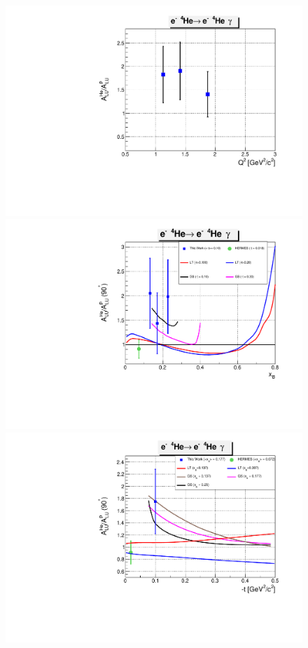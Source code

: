 \begin{figure}[tp]
\centering
\includegraphics[scale=0.37]{fig_updated/BSA_ratio_coh_Q2.pdf}\\
\includegraphics[scale=0.37]{fig_updated/BSA_ratio_coh_xB.pdf}\\
\includegraphics[scale=0.37]{fig_updated/BSA_ratio_coh_t.pdf}

\end{figure}
